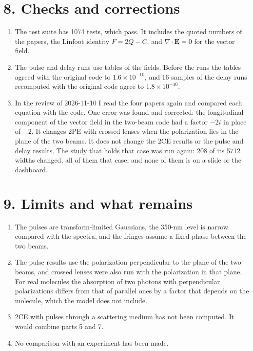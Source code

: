 \documentclass[10pt]{article}
\begin{document}
\section*{8. Checks and corrections}
\begin{enumerate}
\item The test suite has 1074 tests, which pass. It includes the quoted numbers of the papers, the Linfoot identity
$F = 2Q - C$, and $\nabla\cdot\mathbf{E} = 0$ for the vector field.
\item The pulse and delay runs use tables of the fields. Before the runs the tables agreed with the original code
to $1.6\times10^{-10}$, and 16 samples of the delay runs recomputed with the original code agree to
$1.8\times10^{-10}$.
\item In the review of 2026-11-10 I read the four papers again and compared each equation with the code. One error
was found and corrected: the longitudinal component of the vector field in the two-beam code had a factor $-2i$
in place of $-2$. It changes 2PE with crossed lenses when the polarization lies in the plane of the two beams. It
does not change the 2CE results or the pulse and delay results. The study that holds that case was run again:
208 of its 5712 widths changed, all of them that case, and none of them is on a slide or the dashboard.
\end{enumerate}

\section*{9. Limits and what remains}
\begin{enumerate}
\item The pulses are transform-limited Gaussians, the 350-nm level is narrow compared with the spectra, and the
fringes assume a fixed phase between the two beams.
\item The pulse results use the polarization perpendicular to the plane of the two beams, and crossed lenses
were also run with the polarization in that plane. For real molecules the absorption of two photons with
perpendicular polarizations differs from that of parallel ones by a factor that depends on the molecule, which
the model does not include.
\item 2CE with pulses through a scattering medium has not been computed. It would combine parts 5 and 7.
\item No comparison with an experiment has been made.
\end{enumerate}
\end{document}

